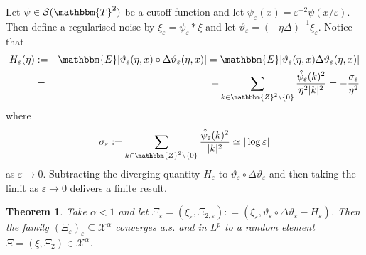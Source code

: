 \documentclass{amsart}
\newcommand{\assign}{:=}
\newtheorem{theorem}{Theorem}
\theoremstyle{remark}
\theoremstyle{definition}
\begin{document}
Let $\psi \in \mathcal{S} (\mathbbm{T}^2)$ be a cutoff function and let
$\psi_{\varepsilon} (x) = \varepsilon^{- 2} \psi (x / \varepsilon)$. Then
define a regularised noise by $\xi_{\varepsilon} = \psi_{\varepsilon} \ast
\xi$ and let $\vartheta_{\varepsilon} = (- \eta \Delta)^{- 1}
\xi_{\varepsilon}$. Notice that
\begin{eqnarray*}
  H_{\varepsilon} (\eta) & \assign & \mathbbm{E} [\vartheta_{\varepsilon}
  (\eta, x) \circ \Delta \vartheta_{\varepsilon} (\eta, x)] =\mathbbm{E}
  [\vartheta_{\varepsilon} (\eta, x) \Delta \vartheta_{\varepsilon} (\eta,
  x)]\\
  & = & - \sum_{k \in \mathbbm{Z}^2 \backslash \{ 0 \}}
  \frac{\hat{\psi}_{\varepsilon} (k)^2}{\eta^2 | k |^2} = -
  \frac{\sigma_{\varepsilon}}{\eta^2}
\end{eqnarray*}
where
\[ \sigma_{\varepsilon} \assign \sum_{k \in \mathbbm{Z}^2 \backslash \{ 0 \}}
   \frac{\hat{\psi}_{\varepsilon} (k)^2}{| k |^2} \simeq | \log \varepsilon |
\]
as $\varepsilon \rightarrow 0$. Subtracting the diverging quantity
$H_{\varepsilon}$ to $\vartheta_{\varepsilon} \circ \Delta
\vartheta_{\varepsilon}$ and then taking the limit as $\varepsilon \rightarrow
0$ delivers a finite result.

\begin{theorem}
  \label{th:conv-white-noise}Take $\alpha < 1$ and let $\Xi_{\varepsilon} =
  (\xi_{\varepsilon}, \Xi_{2, \varepsilon}) : = (\xi_{\varepsilon},
  \vartheta_{\varepsilon} \circ \Delta \vartheta_{\varepsilon} -
  H_{\varepsilon})$. Then the family $(\Xi_{\varepsilon})_{\varepsilon}
  \subseteq \mathcal{X}^{\alpha}$ converges a.s. and in $L^p$ to a random
  element $\Xi = (\xi, \Xi_2) \in \mathcal{X}^{\alpha}$.
\end{theorem}
\end{document}
